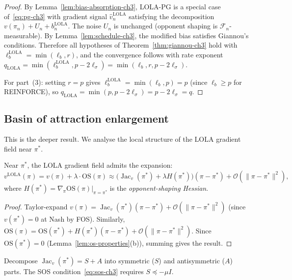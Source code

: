 \begin{proof}
By Lemma~\ref{lem:bias-absorption-ch3}, LOLA-PG is a special case of~\eqref{eq:pg-ch3} with gradient signal $\hat{v}_n^{\mathrm{LOLA}}$ satisfying the decomposition $v(\pi_n) + U_n + b_n^{\mathrm{LOLA}}$. The noise $U_n$ is unchanged (opponent shaping is $\mathcal{F}_n$-measurable). By Lemma~\ref{lem:schedule-ch3}, the modified bias satisfies Giannou's conditions. Therefore all hypotheses of Theorem~\ref{thm:giannou-ch3} hold with $\ell_b^{\mathrm{LOLA}} = \min(\ell_b, r)$, and the convergence follows with rate exponent $q_{\mathrm{LOLA}} = \min(\ell_b^{\mathrm{LOLA}}, p - 2\ell_\sigma) = \min(\ell_b, r, p - 2\ell_\sigma)$.

For part~(3): setting $r = p$ gives $\ell_b^{\mathrm{LOLA}} = \min(\ell_b, p) = p$ (since $\ell_b \geq p$ for REINFORCE), so $q_{\mathrm{LOLA}} = \min(p, p - 2\ell_\sigma) = p - 2\ell_\sigma = q$.
\end{proof}


\subsection{Basin of attraction enlargement}

This is the deeper result. We analyse the local structure of the LOLA gradient field near $\pi^*$.

\begin{lemma}
\label{lem:linearisation}
Near $\pi^*$, the LOLA gradient field admits the expansion:
\begin{equation}
    v^{\mathrm{LOLA}}(\pi) = v(\pi) + \lambda \cdot \mathrm{OS}(\pi) \approx \bigl(\operatorname{Jac}_v(\pi^*) + \lambda H(\pi^*)\bigr)(\pi - \pi^*) + \mathcal{O}(\|\pi - \pi^*\|^2),
\end{equation}
where $H(\pi^*) = \nabla_\pi \mathrm{OS}(\pi)\big|_{\pi = \pi^*}$ is the \emph{opponent-shaping Hessian}.
\end{lemma}

\begin{proof}
Taylor-expand $v(\pi) = \operatorname{Jac}_v(\pi^*)(\pi - \pi^*) + \mathcal{O}(\|\pi - \pi^*\|^2)$ (since $v(\pi^*) = 0$ at Nash by FOS). Similarly, $\mathrm{OS}(\pi) = \mathrm{OS}(\pi^*) + H(\pi^*)(\pi - \pi^*) + \mathcal{O}(\|\pi - \pi^*\|^2)$. Since $\mathrm{OS}(\pi^*) = 0$ (Lemma~\ref{lem:os-properties}(b)), summing gives the result.
\end{proof}

Decompose $\operatorname{Jac}_v(\pi^*) = S + A$ into symmetric ($S$) and antisymmetric ($A$) parts. The SOS condition~\eqref{eq:sos-ch3} requires $S \preceq -\mu I$.

